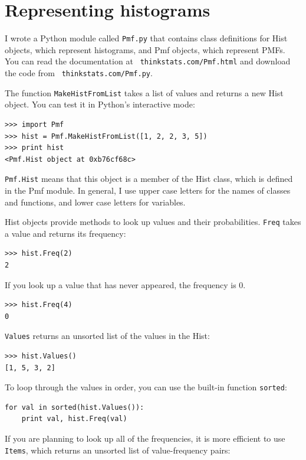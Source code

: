 \documentclass[12pt]{book}
\begin{document}
\section{Representing histograms}

I wrote a Python module called {\tt Pmf.py} that contains class
definitions for Hist objects, which represent histograms, and Pmf
objects, which represent PMFs.  You can read the documentation at {\tt
  thinkstats.com/Pmf.html} and download the code from {\tt
  thinkstats.com/Pmf.py}.

The function {\tt MakeHistFromList} takes a list of values and
returns a new Hist object.  You can test it in Python's interactive
mode:

\begin{verbatim}
>>> import Pmf
>>> hist = Pmf.MakeHistFromList([1, 2, 2, 3, 5])
>>> print hist
<Pmf.Hist object at 0xb76cf68c>
\end{verbatim}

{\tt Pmf.Hist} means that this object is a member of the Hist class,
which is defined in the Pmf module.  In general, I use upper case
letters for the names of classes and functions, and lower case letters
for variables.

Hist objects provide methods to look up values and their
probabilities.  {\tt Freq} takes a value and returns its frequency:

\begin{verbatim}
>>> hist.Freq(2)
2
\end{verbatim}

If you look up a value that has never appeared, the frequency is 0.

\begin{verbatim}
>>> hist.Freq(4)
0
\end{verbatim}

{\tt Values} returns an unsorted list of the values in the Hist:

\begin{verbatim}
>>> hist.Values()
[1, 5, 3, 2]
\end{verbatim}

To loop through the values in order, you can use the built-in function
{\tt sorted}:

\begin{verbatim}
for val in sorted(hist.Values()):
    print val, hist.Freq(val)
\end{verbatim}

If you are planning to look up all of the frequencies, it is more
efficient to use {\tt Items}, which returns an unsorted list of
value-frequency pairs:
\end{document}
